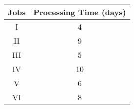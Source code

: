 
\begin{tabular}{|c|c|}                                     \hline \textbf{Jobs} & \textbf{Processing Time (days)} \\ \hline I & 4 \\     \hline II & 9 \\ \hline III & 5 \\ \hline IV & 10 \\ \hline V & 6 \\ \hline VI & 8 \\ \hline                  
\end{tabular}                           
